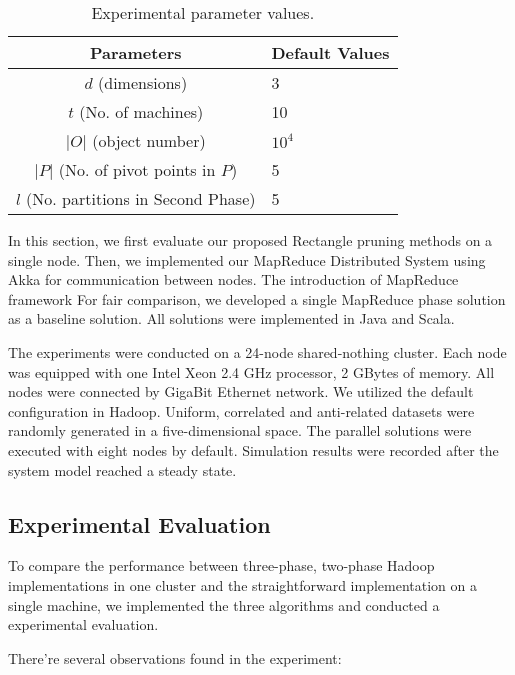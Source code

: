 \begin{table}[t]
\begin{center}
    \begin{tabular}{|c|p{2cm}|}
    \hline
    Parameters & Default Values\\ \hline
    \hline
    $d$ (dimensions) & 3 \\ \hline
    $t$ (No. of machines) & 10 \\ \hline
    $|O|$ (object number) & $10^4$ \\ \hline
    $|P|$ (No. of pivot points in $P$) & 5 \\  \hline
    $l$ (No. partitions in Second Phase) & 5 \\   \hline
    \end{tabular}
\end{center}
\vspace{-8pt} \caption{Experimental parameter values.}
\label{tab_para} \vspace{-8pt}
\end{table}

In this section, we first evaluate our proposed Rectangle pruning methods on a single node. Then, we implemented our MapReduce Distributed System using Akka for communication between nodes. The introduction of MapReduce framework
For fair comparison, we developed a single MapReduce phase solution as a baseline solution. All solutions were implemented in Java and Scala.

The experiments were conducted on a 24-node shared-nothing
cluster. Each node was equipped with one Intel Xeon 2.4 GHz
processor, 2 GBytes of memory. All nodes were connected by GigaBit
Ethernet network. We utilized the default configuration in Hadoop.
Uniform, correlated and anti-related datasets were randomly generated in a
five-dimensional space. The parallel solutions were executed with
eight nodes by default. Simulation results were recorded after the
system model reached a steady state.


\subsection{Experimental Evaluation}
To compare the performance between three-phase, two-phase Hadoop implementations in one cluster and the straightforward implementation on a single machine, we implemented the three algorithms and conducted a experimental evaluation.

There're several observations found in the experiment:


